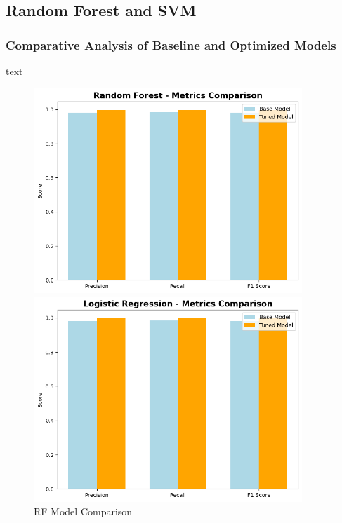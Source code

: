     \subsection{Random Forest and SVM}
    
        \subsubsection{Comparative Analysis of Baseline and Optimized Models \\}
        
            text %
        
            \begin{figure}[h]
                \centering
                \begin{minipage}[c]{0.47\textwidth}
                    \centering
                    \includegraphics[width=0.9\textwidth]{../figures/plots/section2/Random_Forest_Metric_comparison.png}
                    \caption{RF Model Comparison}
                    \label{fig:logistic_tuning}
                \end{minipage}
                \hfill
                \begin{minipage}[c]{0.47\textwidth}
                    \centering
                    \includegraphics[width=0.9\textwidth]{../figures/plots/section2/Logistic_Regression_Metric_comparison.png}

\end{minipage}
\end{figure}
